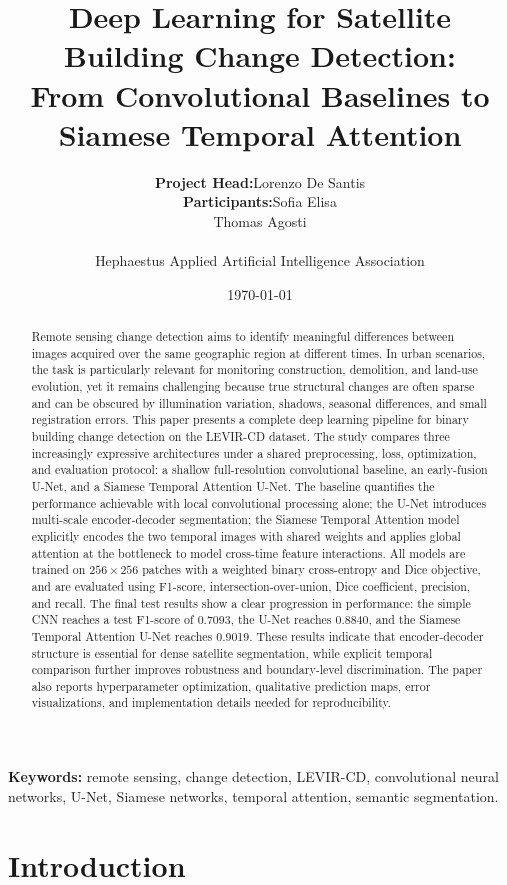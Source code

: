 \documentclass[11pt,a4paper]{article}
\title{\textbf{Deep Learning for Satellite Building Change Detection:\\
From Convolutional Baselines to Siamese Temporal Attention}}
\author{%
\begin{tabular}{@{}rl@{}}
\textbf{Project Head:} & Lorenzo De Santis \\
\textbf{Participants:} & Sofia Elisa \\
                       & Thomas Agosti
\end{tabular}\\[0.8em]
Hephaestus Applied Artificial Intelligence Association%
}
\date{\today}
\begin{document}
\maketitle

\begin{abstract}
Remote sensing change detection aims to identify meaningful differences between images acquired over the same geographic region at different times. In urban scenarios, the task is particularly relevant for monitoring construction, demolition, and land-use evolution, yet it remains challenging because true structural changes are often sparse and can be obscured by illumination variation, shadows, seasonal differences, and small registration errors. This paper presents a complete deep learning pipeline for binary building change detection on the LEVIR-CD dataset. The study compares three increasingly expressive architectures under a shared preprocessing, loss, optimization, and evaluation protocol: a shallow full-resolution convolutional baseline, an early-fusion U-Net, and a Siamese Temporal Attention U-Net. The baseline quantifies the performance achievable with local convolutional processing alone; the U-Net introduces multi-scale encoder-decoder segmentation; the Siamese Temporal Attention model explicitly encodes the two temporal images with shared weights and applies global attention at the bottleneck to model cross-time feature interactions. All models are trained on $256 \times 256$ patches with a weighted binary cross-entropy and Dice objective, and are evaluated using F1-score, intersection-over-union, Dice coefficient, precision, and recall. The final test results show a clear progression in performance: the simple CNN reaches a test F1-score of 0.7093, the U-Net reaches 0.8840, and the Siamese Temporal Attention U-Net reaches 0.9019. These results indicate that encoder-decoder structure is essential for dense satellite segmentation, while explicit temporal comparison further improves robustness and boundary-level discrimination. The paper also reports hyperparameter optimization, qualitative prediction maps, error visualizations, and implementation details needed for reproducibility.
\end{abstract}

\noindent\textbf{Keywords:} remote sensing, change detection, LEVIR-CD, convolutional neural networks, U-Net, Siamese networks, temporal attention, semantic segmentation.

\newpage
\tableofcontents
\newpage

\section{Introduction}
\end{document}
